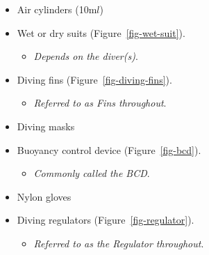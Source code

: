 \documentclass[
  12pt,
]{report}
\providecommand{\tightlist}{%
  \setlength{\itemsep}{0pt}\setlength{\parskip}{0pt}}\usepackage{longtable,booktabs,array}
\begin{document}
\begin{itemize}
\tightlist
\item
  Air cylinders (10m\(l\))
\item
  Wet or dry suits (Figure~\ref{fig-wet-suit}).

  \begin{itemize}
  \tightlist
  \item
    \emph{Depends on the diver(s)}.
  \end{itemize}
\item
  Diving fins (Figure~\ref{fig-diving-fins}).

  \begin{itemize}
  \tightlist
  \item
    \emph{Referred to as Fins throughout}.
  \end{itemize}
\item
  Diving masks
\item
  Buoyancy control device (Figure~\ref{fig-bcd}).

  \begin{itemize}
  \tightlist
  \item
    \emph{Commonly called the BCD}.
  \end{itemize}
\item
  Nylon gloves
\item
  Diving regulators (Figure~\ref{fig-regulator}).

  \begin{itemize}
  \tightlist
  \item
    \emph{Referred to as the Regulator throughout}.
  \end{itemize}
\end{itemize}
\end{document}
